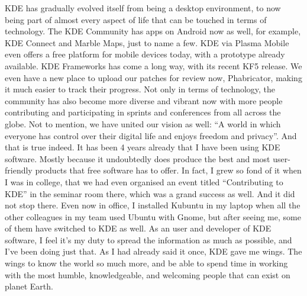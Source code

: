 KDE has gradually evolved itself from being a desktop environment, to now being part of almost every aspect of life that can be touched in terms of technology. The KDE Community has apps on Android now as well, for example, KDE Connect and Marble Maps, just to name a few. KDE via Plasma Mobile even offers a free platform for mobile devices today, with a prototype already available. KDE Frameworks has come a long way, with its recent KF5 release. We even have a new place to upload our patches for review now, Phabricator, making it much easier to track their progress.  Not only in terms of technology, the community has also become more diverse and vibrant now with more people contributing and participating in sprints and conferences from all across the globe. Not to mention, we have united our vision as well: “A world in which everyone has control over their digital life and enjoys freedom and privacy”. And that is true indeed. It has been 4 years already that I have been using KDE software. Mostly because it undoubtedly does produce the best and most user-friendly products that free software has to offer. In fact, I grew so fond of it when I was in college, that we had even organised an event titled “Contributing to KDE” in the seminar room there, which was a grand success as well. And it did not stop there. Even now in office, I installed Kubuntu in my laptop when all the other colleagues in my team used Ubuntu with Gnome, but after seeing me, some of them have switched to KDE as well. As an user and developer of KDE software, I feel it's my duty to spread the information as much as possible, and I've been doing just that. As I had already said it once, KDE gave me wings. The wings to know the world so much more, and be able to spend time in working with the most humble, knowledgeable, and welcoming people that can exist on planet Earth. 

